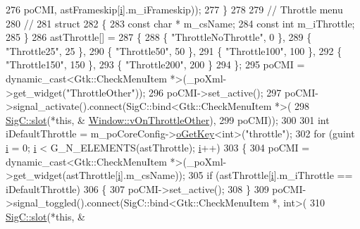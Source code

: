 \begin{DoxyCode}
{{276                                       poCMI, astFrameskip[\mbox{\hyperlink{expr-lex_8cpp_acb559820d9ca11295b4500f179ef6392}{i}}].m\_iFrameskip));
277   \}
278 
279   \textcolor{comment}{// Throttle menu}
280   \textcolor{comment}{//}
281   \textcolor{keyword}{struct}
282   \{
283     \textcolor{keyword}{const} \textcolor{keywordtype}{char} * m\_csName;
284     \textcolor{keyword}{const} \textcolor{keywordtype}{int}    m\_iThrottle;
285   \}
286   astThrottle[] =
287   \{
288     \{ \textcolor{stringliteral}{"ThrottleNoThrottle"},   0 \},
289     \{ \textcolor{stringliteral}{"Throttle25"},          25 \},
290     \{ \textcolor{stringliteral}{"Throttle50"},          50 \},
291     \{ \textcolor{stringliteral}{"Throttle100"},        100 \},
292     \{ \textcolor{stringliteral}{"Throttle150"},        150 \},
293     \{ \textcolor{stringliteral}{"Throttle200"},        200 \}
294   \};
295   poCMI = \textcolor{keyword}{dynamic\_cast<}Gtk::CheckMenuItem *\textcolor{keyword}{>}(\_poXml->get\_widget(\textcolor{stringliteral}{"ThrottleOther"}));
296   poCMI->set\_active();
297   poCMI->signal\_activate().connect(SigC::bind<Gtk::CheckMenuItem *>(
298                                      \mbox{\hyperlink{namespace_sig_c_a92e4f19202b77e78ac1db05f5a62f6b6}{SigC::slot}}(*\textcolor{keyword}{this}, &
      \mbox{\hyperlink{class_v_b_a_1_1_window_a3d2033ebb1a3ef25bada10bef93e856a}{Window::vOnThrottleOther}}),
299                                      poCMI));
300 
301   \textcolor{keywordtype}{int} iDefaultThrottle = m\_poCoreConfig->\mbox{\hyperlink{class_v_b_a_1_1_config_1_1_section_ab169d7aae4e9dde91418ba1668e3ad39}{oGetKey}}<\textcolor{keywordtype}{int}>(\textcolor{stringliteral}{"throttle"});
302   \textcolor{keywordflow}{for} (guint \mbox{\hyperlink{expr-lex_8cpp_acb559820d9ca11295b4500f179ef6392}{i}} = 0; \mbox{\hyperlink{expr-lex_8cpp_acb559820d9ca11295b4500f179ef6392}{i}} < G\_N\_ELEMENTS(astThrottle); \mbox{\hyperlink{expr-lex_8cpp_acb559820d9ca11295b4500f179ef6392}{i}}++)
303   \{
304     poCMI = \textcolor{keyword}{dynamic\_cast<}Gtk::CheckMenuItem *\textcolor{keyword}{>}(\_poXml->get\_widget(astThrottle[\mbox{\hyperlink{expr-lex_8cpp_acb559820d9ca11295b4500f179ef6392}{i}}].m\_csName));
305     \textcolor{keywordflow}{if} (astThrottle[\mbox{\hyperlink{expr-lex_8cpp_acb559820d9ca11295b4500f179ef6392}{i}}].m\_iThrottle == iDefaultThrottle)
306     \{
307       poCMI->set\_active();
308     \}
309     poCMI->signal\_toggled().connect(SigC::bind<Gtk::CheckMenuItem *, int>(
310                                       \mbox{\hyperlink{namespace_sig_c_a92e4f19202b77e78ac1db05f5a62f6b6}{SigC::slot}}(*\textcolor{keyword}{this}, &
}}
\end{DoxyCode}
